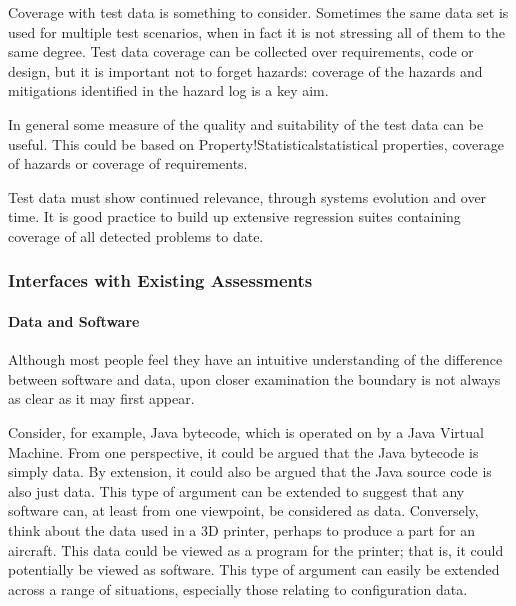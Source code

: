 Coverage with test data is something to consider. Sometimes the same data set is used for multiple test scenarios, when in fact it is not stressing all of them to the same degree. Test data coverage can be collected over requirements, code or design, but it is important not to forget hazards: coverage of the hazards and mitigations identified in the \gls{hazard log} is a key aim. 

In general some measure of the quality and suitability of the test data can be useful. This could be based on {Property!Statistical}statistical properties, coverage of hazards or coverage of requirements. 

Test data must show continued relevance, through systems evolution and over time. It is good practice to build up extensive regression suites containing coverage of all detected problems to date.

\subsubsection{Interfaces with Existing Assessments}
\paragraph{Data and Software}
Although most people feel they have an intuitive understanding of the difference between software and data, upon closer examination the boundary is not always as clear as it may first appear.

Consider, for example, Java bytecode, which is operated on by a Java Virtual Machine. From one perspective, it could be argued that the Java bytecode is simply data. By extension, it could also be argued that the Java source code is also just data. This type of argument can be extended to suggest that any software can, at least from one viewpoint, be considered as data. Conversely, think about the data used in a 3D printer, perhaps to produce a part for an aircraft. This data could be viewed as a program for the printer; that is, it could potentially be viewed as software. This type of argument can easily be extended across a range of situations, especially those relating to \gls{configuration data}.

